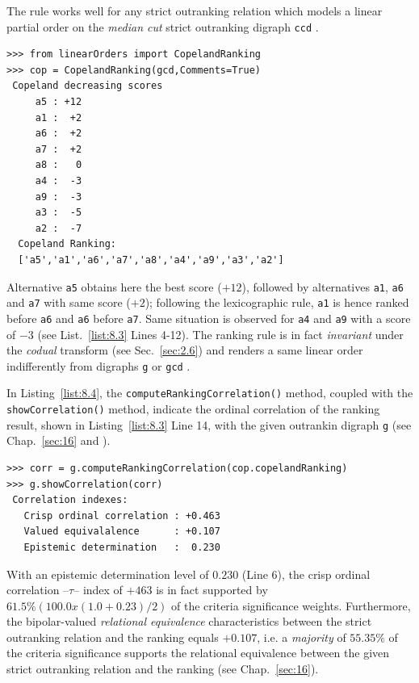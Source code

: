 The \Copeland rule works well for any strict outranking relation which models a linear partial order on the \emph{median cut} strict outranking digraph \texttt{ccd} \citep{DIA-2010}. 
\begin{lstlisting}[caption={Computing a \Copeland Ranking},label=list:8.3]
>>> from linearOrders import CopelandRanking
>>> cop = CopelandRanking(gcd,Comments=True)
 Copeland decreasing scores
     a5 : +12
     a1 :  +2
     a6 :  +2
     a7 :  +2
     a8 :   0
     a4 :  -3
     a9 :  -3
     a3 :  -5
     a2 :  -7
  Copeland Ranking:
  ['a5','a1','a6','a7','a8','a4','a9','a3','a2']
\end{lstlisting}

Alternative \texttt{a5} obtains here the best \Copeland score ($+12$), followed by alternatives \texttt{a1}, \texttt{a6} and \texttt{a7} with same score ($+2$); following the lexicographic rule, \texttt{a1} is hence ranked before \texttt{a6} and \texttt{a6} before \texttt{a7}. Same situation is observed for \texttt{a4} and \texttt{a9} with a score of $-3$ (see List.~\vref{list:8.3} Lines 4-12). The \Copeland ranking rule is in fact \emph{invariant} under the \emph{codual} transform (see Sec.~\ref{sec:2.6}) and renders a same linear order indifferently from digraphs \texttt{g} or \texttt{gcd} .

In Listing~\vref{list:8.4}, the \texttt{computeRankingCorrelation()} method, coupled with the \texttt{showCorrelation()} method, indicate the ordinal correlation of the \Copeland ranking result, shown in Listing~\vref{list:8.3} Line 14, with the given outrankin digraph \texttt{g} (see Chap.~\ref{sec:16} and \citet{BIS-2012a}).
\begin{lstlisting}[caption={Checking the ordinal quality of the \Copeland ranking},label=list:8.4]
>>> corr = g.computeRankingCorrelation(cop.copelandRanking)
>>> g.showCorrelation(corr)
 Correlation indexes:
   Crisp ordinal correlation : +0.463
   Valued equivalalence      : +0.107
   Epistemic determination   :  0.230
\end{lstlisting}

With an epistemic determination level of $0.230$ (Line 6), the crisp ordinal correlation --\Kendall $\tau$-- index of $+463$ is in fact supported by $61.5\% (100.0 x (1.0 + 0.23)/2)$ of the criteria significance weights. Furthermore, the bipolar-valued \emph{relational equivalence} characteristics between the strict outranking relation and the \Copeland ranking equals $+0.107$, i.e. a \emph{majority} of $55.35\%$ of the criteria significance supports the relational equivalence between the given strict outranking relation and the \Copeland ranking (see Chap.~\ref{sec:16}).

